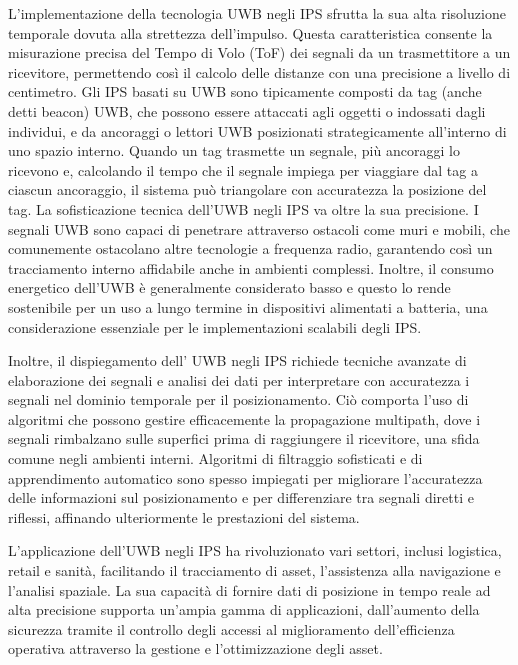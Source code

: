 L'implementazione della tecnologia UWB negli IPS sfrutta la sua alta risoluzione temporale dovuta alla strettezza dell'impulso. Questa caratteristica consente la misurazione precisa del Tempo di Volo (ToF) dei segnali da un trasmettitore a un ricevitore, permettendo così il calcolo delle distanze con una precisione a livello di centimetro. Gli IPS basati su UWB sono tipicamente composti da tag (anche detti beacon) UWB, che possono essere attaccati agli oggetti o indossati dagli individui, e da ancoraggi o lettori UWB posizionati strategicamente all'interno di uno spazio interno. Quando un tag trasmette un segnale, più ancoraggi lo ricevono e, calcolando il tempo che il segnale impiega per viaggiare dal tag a ciascun ancoraggio, il sistema può triangolare con accuratezza la posizione del tag.
La sofisticazione tecnica dell'UWB negli IPS va oltre la sua precisione. I segnali UWB sono capaci di penetrare attraverso ostacoli come muri e mobili, che comunemente ostacolano altre tecnologie a frequenza radio, garantendo così un tracciamento interno affidabile anche in ambienti complessi. Inoltre, il consumo energetico dell'UWB è generalmente considerato basso e questo lo rende sostenibile per un uso a lungo termine in dispositivi alimentati a batteria, una considerazione essenziale per le implementazioni scalabili degli IPS.

Inoltre, il dispiegamento dell' UWB negli IPS richiede tecniche avanzate di elaborazione dei segnali e analisi dei dati per interpretare con accuratezza i segnali nel dominio temporale per il posizionamento. Ciò comporta l'uso di algoritmi che possono gestire efficacemente la propagazione multipath, dove i segnali rimbalzano sulle superfici prima di raggiungere il ricevitore, una sfida comune negli ambienti interni. Algoritmi di filtraggio sofisticati e di apprendimento automatico sono spesso impiegati per migliorare l'accuratezza delle informazioni sul posizionamento e per differenziare tra segnali diretti e riflessi, affinando ulteriormente le prestazioni del sistema.

L'applicazione dell'UWB negli IPS ha rivoluzionato vari settori, inclusi logistica, retail e sanità, facilitando il tracciamento di asset, l'assistenza alla navigazione e l'analisi spaziale. La sua capacità di fornire dati di posizione in tempo reale ad alta precisione supporta un'ampia gamma di applicazioni, dall'aumento della sicurezza tramite il controllo degli accessi al miglioramento dell'efficienza operativa attraverso la gestione e l'ottimizzazione degli asset.

